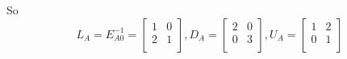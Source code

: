 \documentclass[12pt,letterpaper]{article}
\begin{document}
\begin{enumerate}
\begin{enumerate}
          So
          \[
            L_A
            =
            E_{A0}^{-1}
            =
            \begin{bmatrix}
               1 &  0 \\
               2 &  1 \\
            \end{bmatrix}
            ,
            D_A
            =
            \begin{bmatrix}
               2 &  0 \\
               0 &  3 \\
            \end{bmatrix}
            ,
            U_A
            =
            \begin{bmatrix}
               1 &  2 \\
               0 &  1 \\
            \end{bmatrix}
          \]


\end{enumerate}
\end{enumerate}
\end{document}
